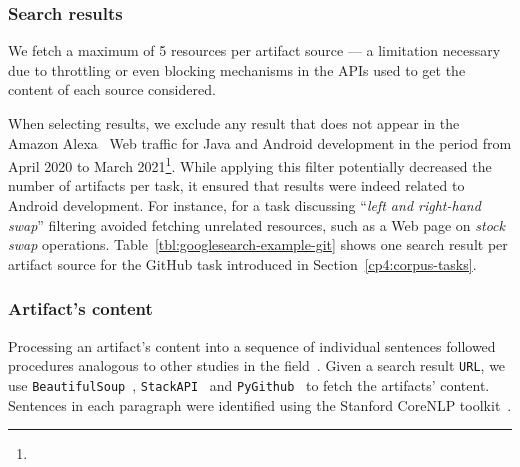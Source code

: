 \subsubsection{Search results}


We fetch a maximum of 5 resources per artifact source --- a limitation necessary due to throttling or even blocking mechanisms in the APIs used to get the content of each source considered.


When selecting results, we exclude any result that does not appear in the Amazon Alexa~\cite{alexa} Web traffic for Java and Android development in the period from April 2020 to March 2021\footnote{}. 
While applying this filter potentially decreased the number of artifacts per task, it ensured that results were indeed related to Android development. 
For instance, for a task discussing ``\textit{left and right-hand swap}'' 
filtering avoided fetching unrelated resources, such as a Web page on  \textit{stock swap} operations.
Table~\ref{tbl:googlesearch-example-git} shows one search result per artifact source for the GitHub task introduced in Section~\ref{cp4:corpus-tasks}.




\subsubsection{Artifact's content}


Processing an artifact's content into a sequence of individual sentences 
followed procedures analogous to other studies in the field~\cite{Arya2019, nadi2020}.
Given a search result \texttt{URL}, we use \texttt{BeautifulSoup}~\cite{beautifulsoup4},
\texttt{StackAPI}~\cite{StackAPI} and \texttt{PyGithub}~\cite{PyGithub}
to fetch the artifacts' content. Sentences in each paragraph
were identified using the Stanford CoreNLP toolkit~\cite{CoreNLP}.








